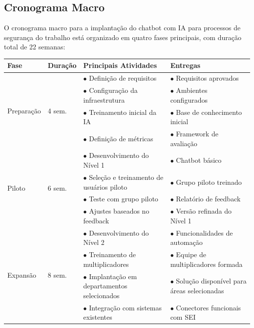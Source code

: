 \documentclass[12pt,a4paper]{article}
\renewcommand{\arraystretch}{1.2}
\begin{document}
\subsection{Cronograma Macro}

O cronograma macro para a implantação do chatbot com IA para processos de segurança do trabalho está organizado em quatro fases principais, com duração total de 22 semanas:

\begin{landscape}
\begin{table}[htbp]
\centering
\renewcommand{\arraystretch}{1.1}
\begin{tabular}{|p{2cm}|p{1.2cm}|p{7cm}|p{6cm}|}
\hline
\rowcolor{gray!20}
\textbf{Fase} & \textbf{Duração} & \textbf{Principais Atividades} & \textbf{Entregas} \\
\hline
\multirow{4}{*}{Preparação} & \multirow{4}{*}{4 sem.} & $\bullet$ Definição de requisitos & $\bullet$ Requisitos aprovados \\
\cline{3-4}
 & & $\bullet$ Configuração da infraestrutura & $\bullet$ Ambientes configurados \\
\cline{3-4}
 & & $\bullet$ Treinamento inicial da IA & $\bullet$ Base de conhecimento inicial \\
\cline{3-4}
 & & $\bullet$ Definição de métricas & $\bullet$ Framework de avaliação \\
\hline
\multirow{4}{*}{Piloto} & \multirow{4}{*}{6 sem.} & $\bullet$ Desenvolvimento do Nível 1 & $\bullet$ Chatbot básico \\
\cline{3-4}
 & & $\bullet$ Seleção e treinamento de usuários piloto & $\bullet$ Grupo piloto treinado \\
\cline{3-4}
 & & $\bullet$ Teste com grupo piloto & $\bullet$ Relatório de feedback \\
\cline{3-4}
 & & $\bullet$ Ajustes baseados no feedback & $\bullet$ Versão refinada do Nível 1 \\
\hline
\multirow{4}{*}{Expansão} & \multirow{4}{*}{8 sem.} & $\bullet$ Desenvolvimento do Nível 2 & $\bullet$ Funcionalidades de automação \\
\cline{3-4}
 & & $\bullet$ Treinamento de multiplicadores & $\bullet$ Equipe de multiplicadores formada \\
\cline{3-4}
 & & $\bullet$ Implantação em departamentos selecionados & $\bullet$ Solução disponível para áreas selecionadas \\
\cline{3-4}
 & & $\bullet$ Integração com sistemas existentes & $\bullet$ Conectores funcionais com SEI \\

\end{tabular}
\end{table}
\end{landscape}
\end{document}
